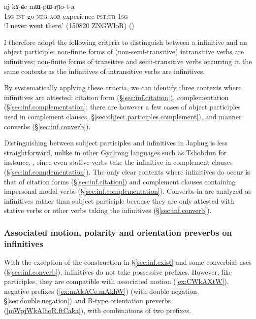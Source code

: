 \begin{exe}
\ex \label{ex:kACe.mWpWrYota}
\gll  aj kɤ-ɕe mɯ-pɯ-rɲo-t-a \\
\textsc{1sg} \textsc{inf}-go \textsc{neg}-\textsc{aor}-experience-\textsc{pst}:\textsc{tr}-\textsc{1sg}  \\
\glt `I never went there.' (150820 ZNGWloR) ()
\end{exe}

I therefore adopt the following criteria to distinguish between a  infinitive and an object participle:   non-finite forms of (non-semi-transitive) intransitive verbs are infinitives;  non-finite forms of transitive and semi-transitive verbs occurring in the same contexts as the infinitives of intransitive verbs are infinitives.

By systematically applying these criteria, we can identify three contexts where infinitives are attested: citation form (§\ref{sec:inf.citation}), complementation (§\ref{sec:inf.complementation}; there are however a few cases of object participles used in complement clauses, §\ref{sec:object.participles.complement}), and manner converbs (§\ref{sec:inf.converb}). 

Distinguishing between subject participles and  infinitives in Japhug is less straightforward, unlike in other Gyalrong languages such as Tshobdun for instance, \citealt{jackson14morpho}, since even stative verbs take the  infinitive in complement clauses (§\ref{sec:inf.complementation}). The only clear contexts where  infinitives do occur is that of citation forms (§\ref{sec:inf.citation}) and complement clauses containing impersonal modal verbs (§\ref{sec:inf.complementation}). Converbs in  are analyzed as infinitives rather than subject participle because they are only attested with stative verbs or other verbs taking the  infinitives (§\ref{sec:inf.converb}).

\subsubsection{Associated motion, polarity and orientation preverbs on infinitives}  \label{sec:infinitives.other.prefixes}
With the exception of the construction in §\ref{sec:inf.exist} and some converbial uses (§\ref{sec:inf.converb}),  infinitives do not take possessive prefixes. However, like participles, they are compatible with associated motion (\ref{ex:CWkAXtW}), negative prefixes (\ref{ex:mAkACe.mAkhW}) (with double negation, §\ref{sec:double.negation}) and B-type orientation preverbs (\ref{mWpjWkAlhoR.ftCaka}), with combinations of two prefixes.

